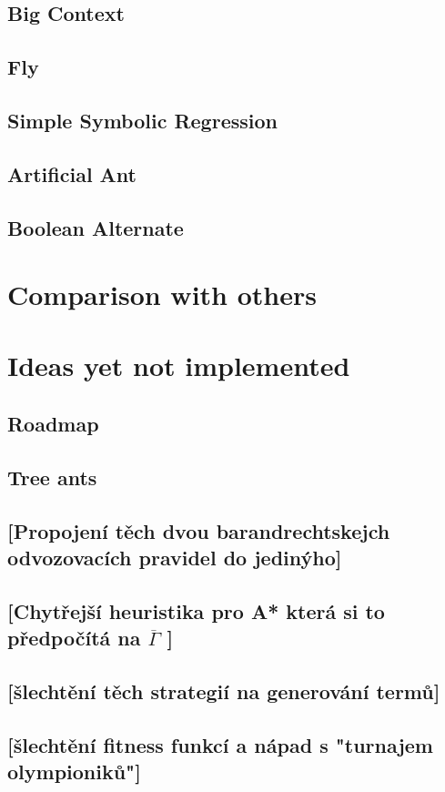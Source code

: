 \documentclass[12pt,a4paper]{report}
\begin{document}
		\section{Big Context}
		\section{Fly}
		\section{Simple Symbolic Regression}
		\section{Artificial Ant}
		\section{Boolean Alternate}
		
\chapter{Comparison with others}

\chapter{Ideas yet not implemented}

\section{Roadmap}
\section{Tree ants}
\section{[Propojení těch dvou barandrechtskejch odvozovacích pravidel do jedinýho]}
\section{[Chytřejší heuristika pro A* která si to předpočítá na $\overline{\Gamma}$ ]}
\section{[šlechtění těch strategií na generování termů]}
\section{[šlechtění fitness funkcí a nápad s "turnajem olympioniků"]}
\end{document}
